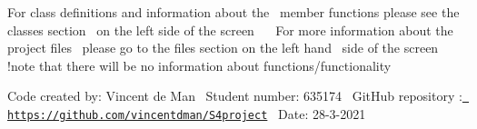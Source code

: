 For class definitions and information about the~\newline
 member functions please see the classes section~\newline
 on the left side of the screen~\newline
 ~\newline
 For more information about the project files~\newline
 please go to the files section on the left hand~\newline
 side of the screen~\newline
 !note that there will be no information about functions/functionality~\newline
 ~\newline


Code created by\+: Vincent de Man~\newline
 Student number\+: 635174~\newline
 Git\+Hub repository \+: \href{https://github.com/vincentdman/S4project}{\texttt{ https\+://github.\+com/vincentdman/\+S4project}}~\newline
 Date\+: 28-\/3-\/2021~\newline
 